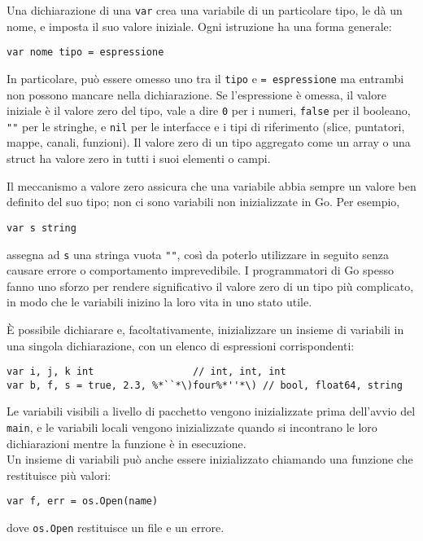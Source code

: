 Una dichiarazione di una \verb|var| crea una variabile di un particolare tipo, le dà un nome, e imposta il suo valore iniziale.
Ogni istruzione ha una forma generale:
\begin{lstlisting}[label={lst:lstlisting1-3.1}]
var nome tipo = espressione
\end{lstlisting}
In particolare, può essere omesso uno tra il \verb|tipo| e \verb|= espressione| ma entrambi non possono mancare nella dichiarazione.
Se l'espressione è omessa, il valore iniziale è il valore zero del tipo, vale a dire \verb|0| per i numeri, \verb|false| per il booleano, \verb|""| per le stringhe, e \verb|nil| per le interfacce e i tipi di riferimento (slice, puntatori, mappe, canali, funzioni).
Il valore zero di un tipo aggregato come un array o una struct ha valore zero in tutti i suoi elementi o campi.

Il meccanismo a valore zero assicura che una variabile abbia sempre un valore ben definito del suo tipo;
non ci sono variabili non inizializzate in Go.
Per esempio,
\begin{lstlisting}[frame=single,label={lst:lstlisting1-3.2}]
var s string
\end{lstlisting}
assegna ad \verb|s| una stringa vuota \verb|""|, così da poterlo utilizzare in seguito senza causare errore o comportamento imprevedibile.
I programmatori di Go spesso fanno uno sforzo per rendere significativo il valore zero di un tipo più complicato, in modo che le variabili inizino la loro vita in uno stato utile.

È possibile dichiarare e, facoltativamente, inizializzare un insieme di variabili in una singola dichiarazione, con un elenco di espressioni corrispondenti:
\begin{lstlisting}[frame=single, label={lst:lstlisting1-3.3}]
var i, j, k int                 // int, int, int
var b, f, s = true, 2.3, %*``*\)four%*''*\)	// bool, float64, string
\end{lstlisting}
Le variabili visibili a livello di pacchetto vengono inizializzate prima dell'avvio del \verb|main|, e le variabili locali vengono inizializzate quando si incontrano le loro dichiarazioni mentre la funzione è in esecuzione.\\
Un insieme di variabili può anche essere inizializzato chiamando una funzione che restituisce più valori:
\begin{lstlisting}[frame=single, label={lst:lstlisting1-3.4}]
var f, err = os.Open(name)
\end{lstlisting}
dove \verb|os.Open| restituisce un file e un errore.